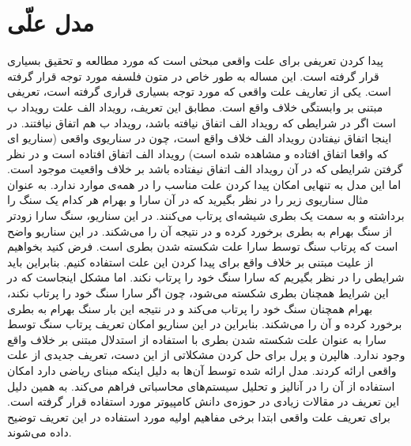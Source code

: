 \documentclass[
msc,
irfonts
]{./tex/tehran-thesis}
\newcommand{\پ}{پروژه/پایان‌نامه/رساله }
\theoremstyle{definition}
\theoremstyle{theorem}
\theoremstyle{definition}
\numberwithin{algorithm}{chapter}
\newcommand{\lf}[1]{\LTRfootnote{#1}}
\begin{document}
\begin{figure}
    \centering
    \caption{}
    \label{fig:es:update}
\end{figure} 
\section{مدل علّی}
پیدا کردن تعریفی برای علت واقعی\lf{Actual Cause}
مبحثی است که مورد مطالعه و تحقیق بسیاری قرار گرفته است.
این مساله به طور خاص در متون فلسفه مورد توجه قرار گرفته است.
یکی از تعاریف علت واقعی که مورد توجه بسیاری قراری گرفته است، تعریفی مبتنی بر وابستگی خلاف واقع\lf{Counterfactual}
است.
مطابق این تعریف، رویداد الف علت رویداد ب است اگر در شرایطی که رویداد الف اتفاق نیافته باشد، رویداد ب هم اتفاق نیافتند.
در اینجا اتفاق نیفتادن رویداد الف خلاف واقع است، چون در سناریوی واقعی
(سناریو ای که واقعا اتفاق افتاده و مشاهده شده است)
رویداد الف اتفاق افتاده است و در نظر گرفتن شرایطی که در آن رویداد الف اتفاق نیفتاده باشد بر خلاف واقعیت موجود است.
اما این مدل به تنهایی امکان پیدا کردن علت مناسب را در همه‌ی موارد ندارد.
به عنوان مثال سناریوی زیر را در نظر بگیرید که در آن سارا و بهرام هر کدام یک سنگ را برداشته و به سمت یک بطری شیشه‌ای پرتاب می‌کنند.
در این سناریو، سنگ سارا زودتر از سنگ بهرام به بطری برخورد کرده و در نتیجه آن را می‌شکند.
در این سناریو واضح است که پرتاب سنگ توسط سارا علت شکسته شدن بطری است.
فرض کنید بخواهیم از علیت مبتنی بر خلاف واقع برای پیدا کردن این علت استفاده کنیم.
بنابراین باید شرایطی را در نظر بگیریم که سارا سنگ خود را پرتاب نکند.
اما مشکل اینجاست که در این شرایط همچنان بطری شکسته می‌شود، چون اگر سارا سنگ خود را پرتاب نکند، بهرام همچنان سنگ خود را پرتاب می‌کند و در نتیجه این بار سنگ بهرام به بطری برخورد کرده و آن را می‌شکند.
بنابراین در این سناریو امکان تعریف پرتاب سنگ توسط سارا به عنوان علت شکسته شدن بطری با استفاده از استدلال مبتنی بر خلاف واقع وجود ندارد.
هالپرن\lf{Halpern}
و پرل\lf{Pearl}
برای حل کردن مشکلاتی از این دست، تعریف جدیدی از علت واقعی
\cite{hp}
ارائه کردند.
مدل ارائه شده توسط آن‌ها به دلیل اینکه مبنای ریاضی دارد امکان استفاده از آن را در آنالیز و تحلیل سیستم‌های محاسباتی فراهم می‌کند.
به همین دلیل این تعریف در مقالات زیادی در حوزه‌ی دانش کامپیوتر مورد استفاده قرار گرفته است.
برای تعریف علت واقعی ابتدا برخی مفاهیم اولیه مورد استفاده در این تعریف توضیح داده می‌شوند.
\end{document}
